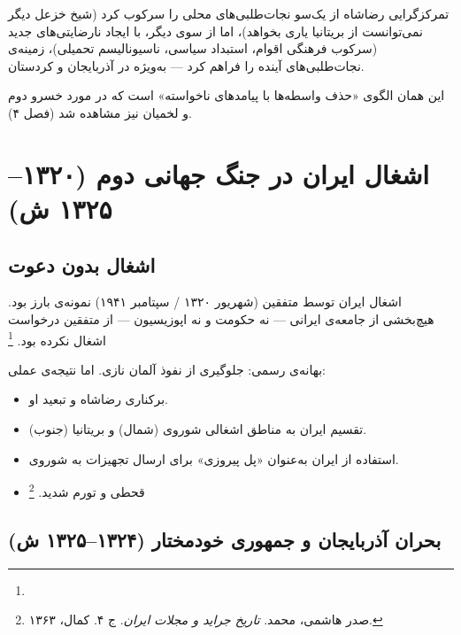 \begin{tcolorbox}[defbox, title={پارادوکس تمرکزگرایی رضاشاه}]
تمرکزگرایی رضاشاه از یک‌سو نجات‌طلبی‌های محلی را سرکوب کرد (شیخ خزعل دیگر نمی‌توانست از بریتانیا یاری بخواهد)، اما از سوی دیگر، با ایجاد نارضایتی‌های جدید (سرکوب فرهنگی اقوام، استبداد سیاسی، ناسیونالیسم تحمیلی)، زمینه‌ی نجات‌طلبی‌های آینده را فراهم کرد — به‌ویژه در آذربایجان و کردستان.

این همان الگوی «حذف واسطه‌ها با پیامدهای ناخواسته» است که در مورد خسرو دوم و لخمیان نیز مشاهده شد (فصل ۴).
\end{tcolorbox}

\section{اشغال ایران در جنگ جهانی دوم (۱۳۲۰–۱۳۲۵ ش)}
\label{sec:ch07-wwii}

\subsection{اشغال بدون دعوت}
\label{subsec:ch07-occupation}

اشغال ایران توسط متفقین (شهریور ۱۳۲۰ / سپتامبر ۱۹۴۱) نمونه‌ی بارز  بود. هیچ‌بخشی از جامعه‌ی ایرانی — نه حکومت و نه اپوزیسیون — از متفقین درخواست اشغال نکرده بود.%
\footnote{}

بهانه‌ی رسمی: جلوگیری از نفوذ آلمان نازی. اما نتیجه‌ی عملی:
\begin{itemize}[nosep, rightmargin=1em]
  \item برکناری رضاشاه و تبعید او.
  \item تقسیم ایران به مناطق اشغالی شوروی (شمال) و بریتانیا (جنوب).
  \item استفاده از ایران به‌عنوان «پل پیروزی» برای ارسال تجهیزات به شوروی.
  \item قحطی و تورم شدید.%
  \footnote{صدر هاشمی، محمد. \textit{تاریخ جراید و مجلات ایران}. ج ۴. کمال، ۱۳۶۳.}
\end{itemize}

\subsection{بحران آذربایجان و جمهوری خودمختار (۱۳۲۴–۱۳۲۵ ش)}
\label{subsec:ch07-azerbaijan-crisis}

